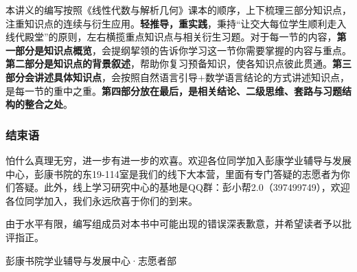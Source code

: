 本讲义的编写按照《线性代数与解析几何》课本的顺序，上下梳理三部分知识点，注重知识点的连续与衍生应用。\textbf{轻推导，重实践}，秉持“让交大每位学生顺利走入线代殿堂”的原则，左右横揽重点知识点与相关衍生习题。对于每一节的内容，\textbf{第一部分是知识点概览}，会提纲挈领的告诉你学习这一节你需要掌握的内容与重点。\textbf{第二部分是知识点的背景叙述}，帮助你复习预备知识，使各知识点彼此贯通。\textbf{第三部分会讲述具体知识点}，会按照自然语言引导+数学语言结论的方式讲述知识点，是每一节的重中之重。\textbf{第四部分放在最后，是相关结论、二级思维、套路与习题结构的整合之处}。

\subsubsection{结束语}
怕什么真理无穷，进一步有进一步的欢喜。欢迎各位同学加入彭康学业辅导与发展中心，彭康书院的东19-114室是我们的线下大本营，里面有专门答疑的志愿者为你们答疑。此外，线上学习研究中心的基地是QQ群：彭小帮2.0（397499749），欢迎各位同学加入，我们永远欣喜于你们的到来。


由于水平有限，编写组成员对本书中可能出现的错误深表歉意，并希望读者予以批评指正。

\vspace{3em}
\hfill\begin{minipage}{7cm}
	\begin{flushright}\kaiti
		彭康书院学业辅导与发展中心·志愿者部\\
		\zhtoday
	\end{flushright}
\end{minipage}